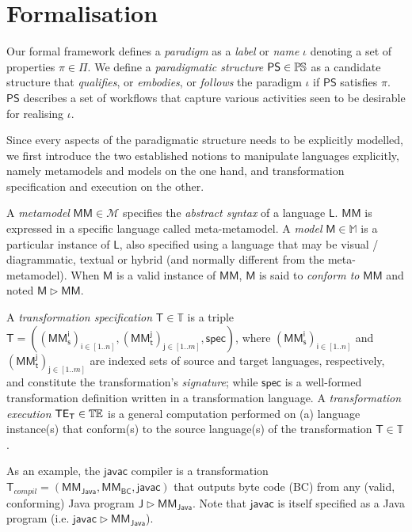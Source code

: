 \section{Formalisation}
\label{sec:Formalisation}

Our formal framework defines a \emph{paradigm} as a \emph{label} or \emph{name}
$\iota$ denoting a set of properties $\pi\in\Pi$.
We define a \emph{paradigmatic structure} $\mathsf{PS}\in \mathbb{P}\mskip-1mu\mathbb{S}$ as a candidate
structure that \emph{qualifies}, or \emph{embodies}, or \emph{follows} the
paradigm $\iota$ if $\mathsf{PS}$ satisfies $\pi$.
$\mathsf{PS}$ describes a set of workflows that capture various activities seen
to be desirable for realising $\iota$.

Since every aspects of the paradigmatic structure needs to be explicitly
modelled, we first introduce the two established notions to manipulate languages
explicitly, namely metamodels and models on the one hand, and transformation
specification and execution on the other.

A \emph{metamodel} $\mathsf{MM} \in \mathcal{M}$ specifies the \emph{abstract 
syntax} of a language $\mathsf{L}$. $\mathsf{MM}$ is expressed in a specific 
language called meta-metamodel. 
A \emph{model} $\mathsf{M} \in \mathbb{M}$ is a particular instance of 
$\mathsf{L}$, also specified using a language that may be visual / 
diagrammatic, textual or hybrid (and normally different from the 
meta-metamodel). When $\mathsf{M}$ is a valid instance of 
$\mathsf{MM}$, $\mathsf{M}$ is said to \emph{conform to} $\mathsf{MM}$ and noted 
$\mathsf{M} \rhd \mathsf{MM}$. 

A \emph{transformation specification} $\mathsf{T}\in\mathbb{T}$ is a triple 
$\mathsf{T} = ((\mathsf{MM_s^{i}})_{\mathsf{i}\in [1..n]}, 
(\mathsf{MM_t^{j}})_{\mathsf{j}\in[1..m]}, \mathsf{spec})$, where  
$(\mathsf{MM_s^{i}})_{\mathsf{i}\in [1..n]}$ and
$(\mathsf{MM_t^{j}})_{\mathsf{j}\in [1..m]}$ are indexed sets of source and
target languages, respectively, and constitute the transformation's 
\emph{signature}; while $\mathsf{spec}$ is a well-formed 
transformation definition written in a transformation language. A 
\emph{transformation execution} $\mathsf{TE_{T}}\in\mathbb{T}\mskip-1mu\mathbb{E}$ is a general 
computation performed on (a) language instance(s) that conform(s) to the 
source language(s) of the transformation $\mathsf{T}\in\mathbb{T}$.

As an example, the $\mathsf{javac}$ compiler is a transformation
$\mathsf{T}_{compil} = (\mathsf{MM_{Java}}, \mathsf{MM_{BC}}, \mathsf{javac})$
that outputs byte code (BC) from any (valid, conforming) Java program
$\mathsf{J}  \rhd \mathsf{MM_{Java}}$.
Note that $\mathsf{javac}$ is itself specified as a Java program (i.e.
$\mathsf{javac} \rhd \mathsf{MM_{Java}}$).

